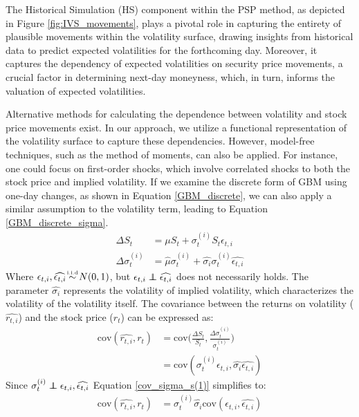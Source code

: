 The Historical Simulation (HS) component within the PSP method, as depicted in Figure \ref{fig:IVS_movements}, plays a pivotal role in capturing the entirety of plausible movements within the volatility surface, drawing insights from historical data to predict expected volatilities for the forthcoming day. Moreover, it captures the dependency of expected volatilities on security price movements, a crucial factor in determining next-day moneyness, which, in turn, informs the valuation of expected volatilities.

Alternative methods for calculating the dependence between volatility and stock price movements exist. In our approach, we utilize a functional representation of the volatility surface to capture these dependencies. However, model-free techniques, such as the method of moments, can also be applied. For instance, one could focus on first-order shocks, which involve correlated shocks to both the stock price and implied volatility. If we examine the discrete form of GBM using one-day changes, as shown in Equation \eqref{GBM_discrete}, we can also apply a similar assumption to the volatility term, leading to Equation \eqref{GBM_discrete_sigma}. 
\begin{align}
    \Delta S_t &= \mu S_t + \sigma_{t}^{(i)} S_t \epsilon_{t, i} \label{GBM_discrete}\\
    \Delta \sigma_{t}^{(i)} &= \hat{\mu} \sigma_{t}^{(i)} + \widehat{\sigma_i} \sigma_{t}^{(i)} \widehat{\epsilon_{t, i}} \label{GBM_discrete_sigma}
\end{align}
Where $\epsilon_{t, i}, \widehat{\epsilon_{t, i}} \simiid N(0,1)$, but $\epsilon_{t, i} \independent \widehat{\epsilon_{t, i}}$ does not necessarily holds. The parameter $\widehat{\sigma_i}$ represents the volatility of implied volatility, which characterizes the volatility of the volatility itself. The covariance between the returns on volatility ($\widehat{r_{t, i}}$) and the stock price ($r_t$) can be expressed as:
\begin{align}
    \text{cov}(\widehat{r_{t, i}}, r_t) &= \text{cov}\Big(\frac{\Delta S_t}{S_t}, \frac{\Delta \sigma_{t}^{(i)}}{\sigma_{t}^{(i)}}\Big) \nonumber\\
    &= \text{cov}(\sigma_{t}^{(i)}\epsilon_{t, i}, \widehat{\sigma_i}\widehat{\epsilon_{t, i}}) \label{cov_sigma_s(1)}
\end{align}
Since $\sigma_{t}^{(i)} \independent \epsilon_{t, i}, \widehat{\epsilon_{t, i}}$ Equation \eqref{cov_sigma_s(1)} simplifies to:
\begin{align}
    \text{cov}(\widehat{r_{t, i}}, r_t) &= \sigma_{t}^{(i)}\widehat{\sigma_i}\text{cov}(\epsilon_{t, i}, \widehat{\epsilon_{t, i}}) \label{cov_sigma_s(2)}
\end{align}
